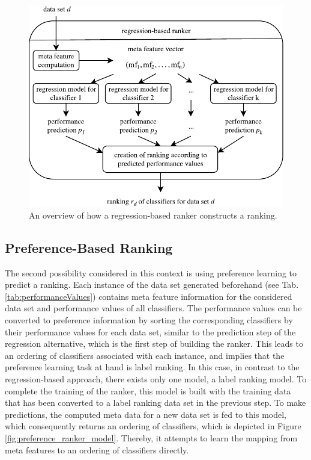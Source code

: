 \begin{figure}
\centering
\includegraphics[scale=1]{gfx/regression_models.pdf}
\caption{An overview of how a regression-based ranker constructs a ranking.}
\label{fig:regression_ranker_model}
\end{figure}

\subsection{Preference-Based Ranking}
The second possibility considered in this context is using preference learning to predict a ranking. Each instance of the data set generated beforehand (see Tab. \ref{tab:performanceValues}) contains meta feature information for the considered data set and performance values of all classifiers. The performance values can be converted to preference information by sorting the corresponding classifiers by their performance values for each data set, similar to the prediction step of the regression alternative, which is the first step of building the ranker. This leads to an ordering of classifiers associated with each instance, and implies that the preference learning task at hand is label ranking. In this case, in contrast to the regression-based approach, there exists only one model, a label ranking model. To complete the training of the ranker, this model is built with the training data that has been converted to a label ranking data set in the previous step. To make predictions, the computed meta data for a new data set is fed to this model, which consequently returns an ordering of classifiers, which is depicted in Figure \ref{fig:preference_ranker_model}. Thereby, it attempts to learn the mapping from meta features to an ordering of classifiers directly.

